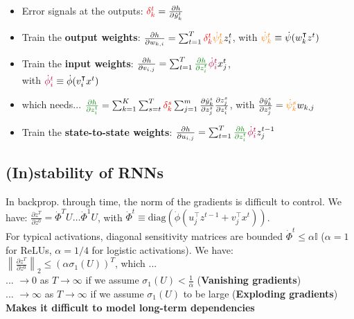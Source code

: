 \begin{itemize}
    \item Error signals at the outputs: $\textcolor{red}{\delta_k^t} = \frac{\partial h}{\partial \hat{y}_k ^t}$
    
    \item Train the \textbf{output weights}: $\frac{\partial h}{\partial w_{k,i}} = \sum_{t=1}^{T}\textcolor{red}{\delta_k^t} \textcolor{orange}{\Dot{\psi}_k^t} z_i^t$, with $\textcolor{orange}{\Dot{\psi}_k^t} \equiv \Dot{\psi}(w^\intercal_k z^t)$
    
    \item Train the \textbf{input weights}: $\frac{\partial h}{\partial v_{i,j}} = \sum_{t=1}^T \textcolor{darkgreen}{\frac{\partial h}{\partial z_i^t}} \textcolor{purple}{\Dot{\phi}_i^t} x_j^t$, \\with $\textcolor{purple}{\Dot{\phi}_i^t} \equiv \Dot{\phi}(v_i^\intercal x^t)$
    
    \item which needs... $\textcolor{darkgreen}{\frac{\partial h}{\partial z_i^t}} = \sum_{k = 1}^K \sum_{s=t}^T \textcolor{red}{\delta_k^s} \sum_{j=1}^m \frac{\partial \hat{y}^s_k}{\partial z^s_j} \frac{\partial z^s_j}{\partial z_i^t}$, with $\frac{\partial \hat{y}^s_k}{\partial z^s_j} = \textcolor{orange}{\Dot{\psi}^s_k} w_{k,j}$

    \item Train the \textbf{state-to-state weights}: $\frac{\partial h}{\partial u_{i,j}} = \sum_{t=1}^T \textcolor{darkgreen}{\frac{\partial h}{\partial z_i^t}} \textcolor{purple}{\Dot{\phi}_i^t} z_j^{t-1}$
\end{itemize}

\subsection{(In)stability of RNNs}
In backprop. through time, the norm of the gradients is difficult to control. We have: $\frac{\partial z^T}{\partial z^0} = \Dot{\Phi}^TU \dots \Dot{\Phi}^1U$, with $\Dot{\Phi}^t \equiv \text{diag} \left(\Dot{\phi}(u^\intercal_j z^{t-1} + v^\intercal_j x^t) \right)$. \\
For typical activations, diagonal sensitivity matrices are bounded $\Dot{\Phi}^t \leq \alpha \mathbb{I}$ ($\alpha = 1$ for ReLUs, $\alpha = 1/4$ for logistic activations). We have: \\ 
$\left\lVert \frac{\partial z^T}{\partial z^0} \right\rVert_2 \leq (\alpha \sigma_1(U))^T$, which ... \\
... $\rightarrow 0$  as $T \rightarrow \infty$ if we assume $\sigma_1(U) < \frac{1}{\alpha}$ (\textbf{Vanishing gradients}) \\
... $\rightarrow \infty$ as $T \rightarrow \infty$ if we assume $\sigma_1(U)$ to be large (\textbf{Exploding gradients})
\textrightarrow \textbf{Makes it difficult to model long-term dependencies}

